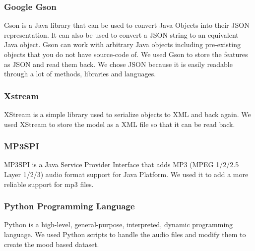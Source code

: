 \subsubsection{Google Gson}

Gson is a Java library that can be used to convert Java Objects into their JSON representation. 
It can also be used to convert a JSON string to an equivalent Java object. 
Gson can work with arbitrary Java objects including pre-existing objects that you do not have source-code of.  
We used Gson to store the features as JSON and read them back. 
We chose JSON because it is easily readable through a lot of methods, libraries and languages.

\subsubsection{Xstream}

XStream is a simple library used to serialize objects to XML and back again.
We used XStream to store the model as a XML file so that it can be read back. 

\subsubsection{MP3SPI}
MP3SPI is a Java Service Provider Interface that adds MP3 (MPEG 1/2/2.5 Layer 1/2/3) audio format support for Java Platform.
We used it to add a more reliable support for mp3 files.

\subsubsection{Python Programming Language}

Python is a high-level, general-purpose, interpreted, dynamic programming language.
We used Python scripts to handle the audio files and modify them to create the mood based dataset.

